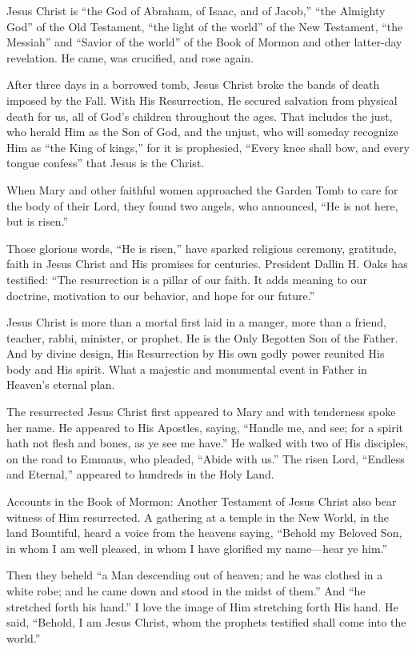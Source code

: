 \documentclass[letterpaper, 11pt]{report}
\begin{document}
Jesus Christ is “the God of Abraham, of Isaac, and of Jacob,” “the Almighty God” of the Old Testament, “the light of the world” of the New Testament, “the Messiah” and “Savior of the world” of the Book of Mormon and other latter-day revelation. He came, was crucified, and rose again.

After three days in a borrowed tomb, Jesus Christ broke the bands of death imposed by the Fall. With His Resurrection, He secured salvation from physical death for us, all of God’s children throughout the ages. That includes the just, who herald Him as the Son of God, and the unjust, who will someday recognize Him as “the King of kings,” for it is prophesied, “Every knee shall bow, and every tongue confess” that Jesus is the Christ.

When Mary and other faithful women approached the Garden Tomb to care for the body of their Lord, they found two angels, who announced, “He is not here, but is risen.”

Those glorious words, “He is risen,” have sparked religious ceremony, gratitude, faith in Jesus Christ and His promises for centuries. President Dallin H. Oaks has testified: “The resurrection is a pillar of our faith. It adds meaning to our doctrine, motivation to our behavior, and hope for our future.”

Jesus Christ is more than a mortal first laid in a manger, more than a friend, teacher, rabbi, minister, or prophet. He is the Only Begotten Son of the Father. And by divine design, His Resurrection by His own godly power reunited His body and His spirit. What a majestic and monumental event in Father in Heaven’s eternal plan.

The resurrected Jesus Christ first appeared to Mary and with tenderness spoke her name. He appeared to His Apostles, saying, “Handle me, and see; for a spirit hath not flesh and bones, as ye see me have.” He walked with two of His disciples, on the road to Emmaus, who pleaded, “Abide with us.” The risen Lord, “Endless and Eternal,” appeared to hundreds in the Holy Land.

Accounts in the Book of Mormon: Another Testament of Jesus Christ also bear witness of Him resurrected. A gathering at a temple in the New World, in the land Bountiful, heard a voice from the heavens saying, “Behold my Beloved Son, in whom I am well pleased, in whom I have glorified my name—hear ye him.”

Then they beheld “a Man descending out of heaven; and he was clothed in a white robe; and he came down and stood in the midst of them.” And “he stretched forth his hand.” I love the image of Him stretching forth His hand. He said, “Behold, I am Jesus Christ, whom the prophets testified shall come into the world.”
\end{document}
